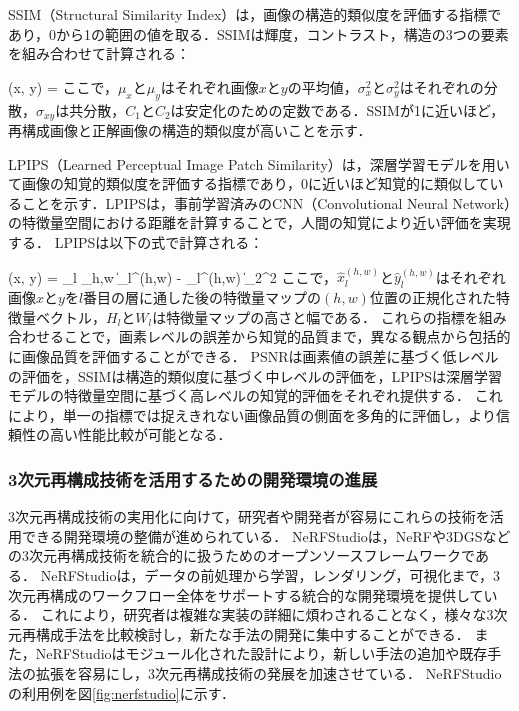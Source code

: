 \documentclass[a4paper,dvipdfmx,ja=standard,9pt]{bxjsarticle}
\let\oldequation\equation
\let\endoldequation\endequation
\renewenvironment{equation}{%
  \oldequation
  \Large  %
}{%
  \endoldequation
}
\begin{document}
SSIM（Structural Similarity Index）は，画像の構造的類似度を評価する指標であり，0から1の範囲の値を取る．SSIMは輝度，コントラスト，構造の3つの要素を組み合わせて計算される：
\begin{equation}
(x, y) = 
\end{equation}
\vspace{-9pt}
ここで，$\mu_x$と$\mu_y$はそれぞれ画像$x$と$y$の平均値，$\sigma_x^2$と$\sigma_y^2$はそれぞれの分散，$\sigma_{xy}$は共分散，$C_1$と$C_2$は安定化のための定数である．SSIMが1に近いほど，再構成画像と正解画像の構造的類似度が高いことを示す．

LPIPS（Learned Perceptual Image Patch Similarity）は，深層学習モデルを用いて画像の知覚的類似度を評価する指標であり，0に近いほど知覚的に類似していることを示す．LPIPSは，事前学習済みのCNN（Convolutional Neural Network）の特徴量空間における距離を計算することで，人間の知覚により近い評価を実現する．
LPIPSは以下の式で計算される：
\begin{equation}
(x, y) = \sum_l  \sum_{h,w} \| _l^{(h,w)} - _l^{(h,w)} \|_2^2
\end{equation}
\vspace{-9pt}
ここで，$\hat{x}_l^{(h,w)}$と$\hat{y}_l^{(h,w)}$はそれぞれ画像$x$と$y$を$l$番目の層に通した後の特徴量マップの$(h, w)$位置の正規化された特徴量ベクトル，$H_l$と$W_l$は特徴量マップの高さと幅である．
これらの指標を組み合わせることで，画素レベルの誤差から知覚的品質まで，異なる観点から包括的に画像品質を評価することができる．
PSNRは画素値の誤差に基づく低レベルの評価を，SSIMは構造的類似度に基づく中レベルの評価を，LPIPSは深層学習モデルの特徴量空間に基づく高レベルの知覚的評価をそれぞれ提供する．
これにより，単一の指標では捉えきれない画像品質の側面を多角的に評価し，より信頼性の高い性能比較が可能となる．

\subsubsection{3次元再構成技術を活用するための開発環境の進展}
3次元再構成技術の実用化に向けて，研究者や開発者が容易にこれらの技術を活用できる開発環境の整備が進められている．
NeRFStudio\cite{nerfstudio}は，NeRFや3DGSなどの3次元再構成技術を統合的に扱うためのオープンソースフレームワークである．
NeRFStudioは，データの前処理から学習，レンダリング，可視化まで，3次元再構成のワークフロー全体をサポートする統合的な開発環境を提供している．
これにより，研究者は複雑な実装の詳細に煩わされることなく，様々な3次元再構成手法を比較検討し，新たな手法の開発に集中することができる．
また，NeRFStudioはモジュール化された設計により，新しい手法の追加や既存手法の拡張を容易にし，3次元再構成技術の発展を加速させている．
NeRFStudioの利用例を図\ref{fig:nerfstudio}に示す．
\end{document}
